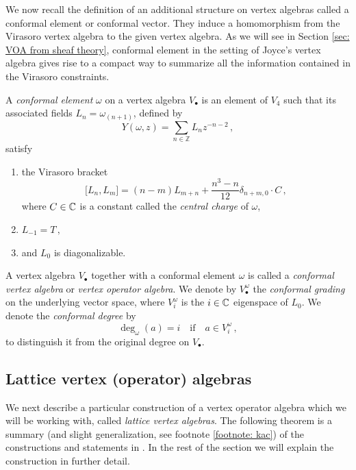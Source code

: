 \documentclass[a4paper, 12pt]{amsart}
\begin{document}
We now recall the definition of an additional structure on vertex algebras called a conformal element or conformal vector. They induce a homomorphism from the Virasoro vertex algebra to the given vertex algebra. As we will see in Section \ref{sec: VOA from sheaf theory}, conformal element in the setting of Joyce's vertex algebra gives rise to a compact way to summarize all the information contained in the Virasoro constraints.
\begin{definition}\label{Def: conformal vertex algebra}
 A \textit{conformal element} $\omega$ on a vertex algebra $V_\bullet$ is an element of $V_4$ such that its associated fields $L_n=\omega_{(n+1)}$, defined by
  $$Y(\omega,z) = \sum_{n\in \mathbb{Z}}L_nz^{-n-2}\,,$$
satisfy
 \begin{enumerate}
     \item the Virasoro bracket 
     \[\big[L_n,L_m\big] = (n-m)L_{m+n} +\frac{n^3-n}{12}\delta_{n+m,0}\cdot C
     \,,\]
     where $C\in {\mathbb{C}}$ is a constant called the \textit{central charge} of $\omega$,
     \item $L_{-1}  = T\,,$
     \item and $L_0$ is diagonalizable. 
 \end{enumerate}


A vertex algebra $V_\bullet$ together with a conformal element $\omega$ is called a \textit{conformal vertex algebra} or \textit{vertex operator algebra}. We denote by $V^\omega_{\bullet}$ the \textit{conformal grading} on the underlying vector space, where $V^\omega_i$ is the $i\in {\mathbb{C}}$ eigenspace of $L_0$. We denote the \textit{conformal degree} by
$$
\deg_\omega(a) =i\quad \text{if} \quad a\in V^\omega_i\,,
$$
to distinguish it from the original degree on $V_\bullet$. 
\end{definition}

\subsection{Lattice vertex (operator) algebras}
We next describe a particular construction of a vertex operator algebra which we will be working with, called \textit{lattice vertex algebras}. The following theorem is a summary (and slight generalization, see footnote \ref{footnote: kac}) of the constructions and statements in \cite[Sections 3.5, 3.6 and 5.5]{Ka98}. In the rest of the section we will explain the construction in further detail.
\end{document}
